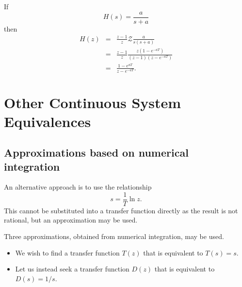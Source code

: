 \begin{slide}\label{slide:l11s10}
\end{slide}

\begin{slide}\label{slide:l11s11}
  If \[H(s) = \frac{a}{s+a}\] then
  \begin{eqnarray*}
    H(z) &=& \frac{z-1}{z}\mathcal{Z} \frac{a}{s(s+a)}\\
         &=& \frac{z-1}{z} \frac{z(1-e^{-aT})}{(z-1)(z-e^{-aT})}\\
         &=& \frac{1-e^{aT}}{z-e^{-aT}}.
  \end{eqnarray*}
\end{slide}

\section*{Other Continuous System Equivalences}

\subsection*{Approximations based on numerical integration}

An alternative approach is to use the relationship \[ s  = \frac{1}{T}
\ln z. \] This cannot be substituted into a transfer function directly
as the result is not rational, but an approximation may be used. 

Three approximations, obtained from numerical integration, may be
used. 

\begin{slide}\label{slide:l11s20a}
  \begin{itemize}
  \item We wish to find a transfer function $T(z)$ that is equivalent to $T(s)=s$.
  \item Let us instead seek a transfer function $D(z)$ that is equivalent to $D(s) = 1/s$.
  \end{itemize}
\end{slide}

